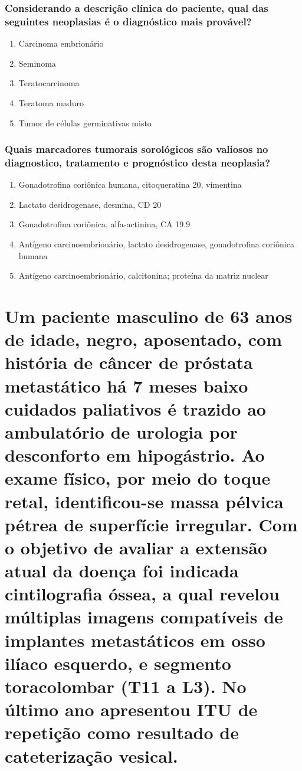 \documentclass[11pt,notitlepage]{article}
\begin{document}
\section{Considerando a descrição clínica do paciente, qual das seguintes neoplasias é o diagnóstico mais provável?}
\begin{multicols}{2}
	\setlength{\columnseprule}{0pt}
	\begin{enumerate}[label=(\alph*)]
		\item Carcinoma embrionário
		\item Seminoma
		\item Teratocarcinoma
		\item Teratoma maduro
		\item Tumor de células germinativas misto
	\end{enumerate}
\end{multicols}
\vspace{0.5cm}

\section{Quais marcadores tumorais sorológicos são valiosos no diagnostico, tratamento e prognóstico desta neoplasia? }
\begin{multicols}{2}
	\setlength{\columnseprule}{0pt}
	\begin{enumerate}[label=(\alph*)]
		\item Gonadotrofina coriônica humana, citoqueratina 20, vimentina
		\item Lactato desidrogenase, desmina, CD 20
		\item Gonadotrofina coriônica, alfa-actinina, CA 19.9
		\item Antígeno carcinoembrionário, lactato desidrogenase, gonadotrofina coriônica humana
		\item Antígeno carcinoembrionário, calcitonina; proteína da matriz nuclear
	\end{enumerate}
\end{multicols}
\vspace{0.5cm}

\part{Um paciente masculino de 63 anos de idade, negro, aposentado, com história de câncer de próstata metastático há 7 meses baixo cuidados paliativos é trazido ao ambulatório de urologia por desconforto em hipogástrio. Ao exame físico, por meio do toque retal, identificou-se massa pélvica pétrea de superfície irregular. Com o objetivo de avaliar a extensão atual da doença foi indicada cintilografia óssea, a qual revelou múltiplas imagens compatíveis de implantes metastáticos em osso ilíaco esquerdo, e segmento toracolombar (T11 a L3). No último ano apresentou ITU de repetição como resultado de cateterização vesical.}
\end{document}

